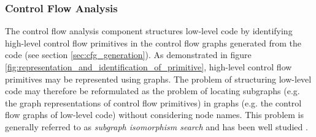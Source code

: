 
\subsubsection{Control Flow Analysis}
\label{sec:design_control_flow_analysis}







%


The control flow analysis component structures low-level code by identifying high-level control flow primitives in the control flow graphs generated from the code (see section \ref{sec:cfg_generation}). As demonstrated in figure \ref{fig:representation_and_identification_of_primitive}, high-level control flow primitives may be represented using graphs. The problem of structuring low-level code may therefore be reformulated as the problem of locating subgraphs (e.g. the graph representations of control flow primitives) in graphs (e.g. the control flow graphs of low-level code) without considering node names. This problem is generally referred to as \textit{subgraph isomorphism search} and has been well studied \cite{subgraph_isomorphism_algorithms}.

